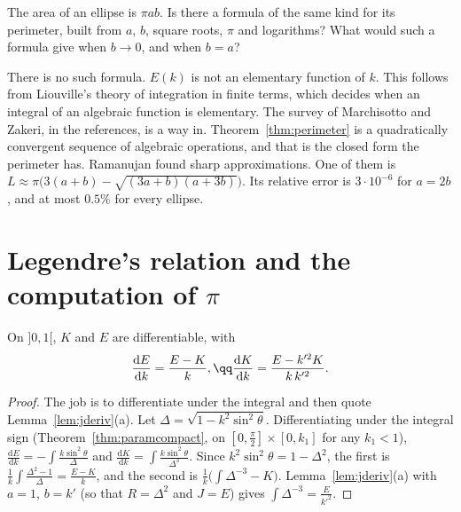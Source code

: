 \begin{think}
The area of an ellipse is $\pi ab$. Is there a formula of the same kind for its perimeter, built from $a$, $b$, square roots, $\pi$ and logarithms? What would such a formula give when $b\to0$, and when $b=a$?
\end{think}

\begin{remark}
There is no such formula. $E(k)$ is not an elementary function of $k$. This follows from Liouville's theory of integration in finite terms, which decides when an integral of an algebraic function is elementary. The survey of Marchisotto and Zakeri, in the references, is a way in. Theorem~\ref{thm:perimeter} is a quadratically convergent sequence of algebraic operations, and that is the closed form the perimeter has. Ramanujan found sharp approximations. One of them is $L\approx\pi\bigl(3(a+b)-\sqrt{(3a+b)(a+3b)}\bigr)$. Its relative error is $3\cdot10^{-6}$ for $a=2b$, and at most $0.5\%$ for every ellipse.
\end{remark}

\section{Legendre's relation and the computation of $\pi$}

\begin{proposition}\label{prop:kederiv}
On $]0,1[$, $K$ and $E$ are differentiable, with
\[
\begin{gathered}\frac{\mathrm dE}{\mathrm dk}=\frac{E-K}k,\qq\frac{\mathrm dK}{\mathrm dk}=\frac{E-k'^2K}{k\,k'^2}.\end{gathered}
\]
\end{proposition}
\begin{proof}
The job is to differentiate under the integral and then quote Lemma~\ref{lem:jderiv}(a). Let $\Delta=\sqrt{1-k^2\sin^2\theta}$. Differentiating under the integral sign (Theorem~\ref{thm:paramcompact}, on $[0,\frac\pi2]\times[0,k_1]$ for any $k_1<1$),
$\frac{\mathrm dE}{\mathrm dk}=-\int\frac{k\sin^2\theta}\Delta$ and $\frac{\mathrm dK}{\mathrm dk}=\int\frac{k\sin^2\theta}{\Delta^3}$. Since $k^2\sin^2\theta=1-\Delta^2$, the first is
$\frac1k\int\frac{\Delta^2-1}\Delta=\frac{E-K}k$, and the second is $\frac1k\bigl(\int\Delta^{-3}-K\bigr)$. Lemma~\ref{lem:jderiv}(a) with $a=1$, $b=k'$ (so that $R=\Delta^2$ and
$J=E$) gives $\int\Delta^{-3}=\frac E{k'^2}$.
\end{proof}

